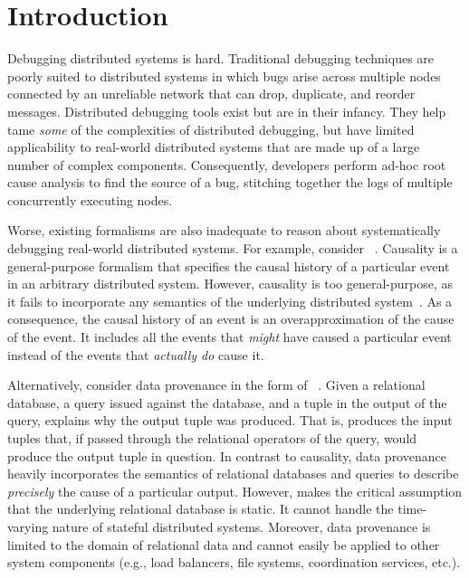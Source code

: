 \section{Introduction}
Debugging distributed systems is hard. Traditional debugging techniques are
poorly suited to distributed systems in which bugs arise across multiple nodes
connected by an unreliable network that can drop, duplicate, and reorder
messages. Distributed debugging tools exist but are in their infancy. They help
tame \emph{some} of the complexities of distributed debugging, but have limited
applicability to real-world distributed systems that are made up of a large
number of complex components. Consequently, developers perform ad-hoc root
cause analysis to find the source of a bug, stitching together the logs of
multiple concurrently executing nodes.

Worse, existing formalisms are also inadequate to reason about systematically
debugging real-world distributed systems. For example, consider
~\cite{lamport1978time}. Causality is a general-purpose
formalism that specifies the causal history of a particular event in an
arbitrary distributed system. However, causality is too general-purpose, as it
fails to incorporate any semantics of the underlying distributed
system~\cite{bailis2012potential}. As a consequence, the causal history of an
event is an overapproximation of the cause of the event. It includes all the
events that \emph{might} have caused a particular event instead of the events
that \emph{actually do} cause it.

Alternatively, consider data provenance in the form of
~\cite{cheney2009provenance, buneman2001and}. Given a
relational database, a query issued against the database, and a tuple in the
output of the query, \whyprovenance{} explains why the output tuple was
produced. That is, \whyprovenance{} produces the input tuples that, if passed
through the relational operators of the query, would produce the output tuple
in question. In contrast to causality, data provenance heavily incorporates the
semantics of relational databases and queries to describe \emph{precisely} the
cause of a particular output. However, \whyprovenance{} makes the critical
assumption that the underlying relational database is static. It cannot handle
the time-varying nature of stateful distributed systems. Moreover, data
provenance is limited to the domain of relational data and cannot easily be
applied to other system components (e.g., load balancers, file systems,
coordination services, etc.).

